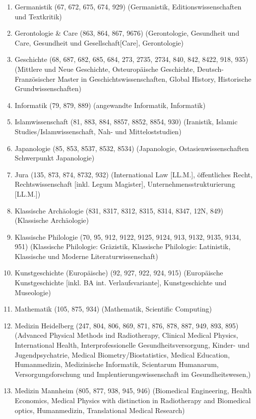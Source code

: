 \begin{enumerate}[noitemsep]
        \item Germanistik (67, 672, 675, 674, 929) (Germanistik, Editionswissenschaften und Textkritik) 
        \item Gerontologie \& Care (863, 864, 867, 9676) (Gerontologie, Gesundheit und Care, Gesundheit und Gesellschaft[Care], Gerontologie) 
        \item Geschichte (68, 687, 682, 685, 684, 273, 2735, 2734, 840, 842, 8422, 918, 935) (Mittlere und Neue Geschichte, Osteuropäische Geschichte, Deutsch-Französischer Master in Geschichtswissenschaften, Global History, Historische Grundwissenschaften) 
        \item Informatik (79, 879, 889) (angewandte Informatik, Informatik) 
        \item Islamwissenschaft (81, 883, 884, 8857, 8852, 8854, 930) (Iranistik, Islamic Studies/Islamwissenschaft, Nah- und Mitteloststudien) 
        \item Japanologie (85, 853, 8537, 8532, 8534) (Japanologie, Ostasienwissenschaften Schwerpunkt Japanologie) 
        \item Jura (135, 873, 874, 8732, 932) (International Law [LL.M.], öffentliches Recht, Rechtswissenschaft [inkl. Legum Magister], Unternehmensstrukturierung [LL.M.]) 
        \item Klassische Archäologie (831, 8317, 8312, 8315, 8314, 8347, 12N, 849) (Klassische Archäologie) 
        \item Klassische Philologie (70, 95, 912, 9122, 9125, 9124, 913, 9132, 9135, 9134, 951) (Klassische Philologie: Gräzistik, Klassische Philologie: Latinistik, Klassische und Moderne Literaturwissenschaft) 
        \item Kunstgeschichte (Europäische) (92, 927, 922, 924, 915) (Europäische Kunstgeschichte [inkl. BA int. Verlaufsvariante], Kunstgeschichte und Museologie) 
        \item Mathematik (105, 875, 934) (Mathematik, Scientific Computing) 
        \item Medizin Heidelberg (247, 804, 806, 869, 871, 876, 878, 887, 949, 893, 895) (Advanced Physical Methods ind Radiotherapy, Clinical Medical Physics, International Health, Interprofessionelle Gesundheitsversorgung, Kinder- und Jugendpsychatrie, Medical Biometry/Biostatistics, Medical Education, Humanmedizin, Medizinische Informatik, Scientarum Humanarum, Versorgungsforschung und Implentierungswissenschaft im Gesundheitswesen,) 
        \item Medizin Mannheim (805, 877, 938, 945, 946) (Biomedical Engineering, Health Economics, Medical Physics with distinction in Radiotherapy and Biomedical optics, Humanmedizin, Translational Medical Research) 

\end{enumerate}
